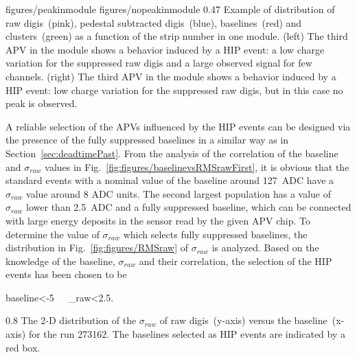                  {figures/peakinmodule} %
                 {figures/nopeakinmodule} %
                 {0.47}       %
                 {Example of distribution of raw digis~(pink), pedestal subtracted digis~(blue), baselines~(red) and clusters~(green) as a function of the strip number in one module. (left) The third APV in the module shows a behavior induced by a HIP event: a low charge variation for the suppressed raw digis and a large observed signal for few channels. (right)  The third APV in the module shows a behavior induced by a HIP event: low charge variation for the suppressed raw digis, but in this case no peak is observed. } %

A reliable selection of the APVs influenced by the HIP events can be designed via the presence of the fully suppressed baselines in a similar way as in Section~\ref{sec:deadtimePast}. From the analysis of the correlation of the baseline and $\sigma_{raw}$ values in Fig.~\ref{fig:figures/baselinevsRMSrawFirst}, it is obvious that the standard events with a nominal value of the baseline around 127~ADC have a $\sigma_{raw}$ value around 8 ADC units.  The second largest population has a value of $\sigma_{raw}$ lower than 2.5~ADC and a fully suppressed baseline, which can be connected with large energy deposits in the sensor read by the given APV chip. To determine the value of $\sigma_{raw}$ which selects fully suppressed baselines, the distribution in Fig.~\ref{fig:figures/RMSraw} of $\sigma_{raw}$ is analyzed. Based on the knowledge of the baseline, $\sigma_{raw}$ and their correlation, the selection of the HIP events has been chosen to be 

{
baseline<-5~~~\sigma_{raw}<2.5.
}


                 {0.8}       %
                 {The 2-D distribution of the $\sigma_{raw}$ of raw digis~(y-axis) versus the baseline~(x-axis) for the run 273162. The baselines selected as HIP events are indicated by a red box. } %




